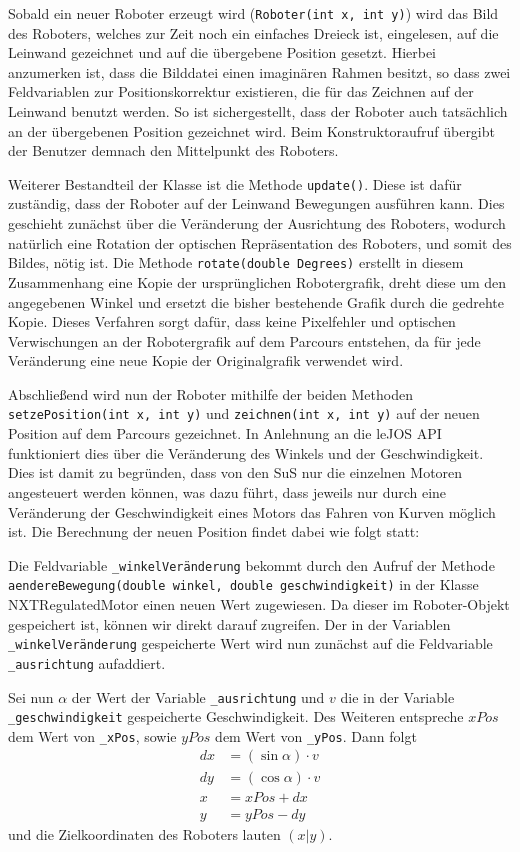 \documentclass[paper=a4, DIV=calc, BCOR=12mm, twoside=on, onecolumn=on, open = right, titlepage =on, parskip =half-, headsepline = on, footsepline = off, chapterprefix = off, appendixprefix = on, fontsize = 12pt, numbers = noenddot, abstract = on]{scrbook}
\begin{document}
Sobald ein neuer Roboter erzeugt wird (\texttt{Roboter(int x, int y)}) wird das Bild des Roboters, welches zur Zeit noch ein einfaches Dreieck ist, eingelesen, auf die Leinwand gezeichnet und auf die übergebene Position gesetzt. Hierbei anzumerken ist, dass die Bilddatei einen imaginären Rahmen besitzt, so dass zwei Feldvariablen zur Positionskorrektur existieren, die für das Zeichnen auf der Leinwand benutzt werden. So ist sichergestellt, dass der Roboter auch tatsächlich an der übergebenen Position gezeichnet wird. Beim Konstruktoraufruf übergibt der Benutzer demnach den Mittelpunkt des Roboters.

Weiterer Bestandteil der Klasse ist die Methode \texttt{update()}. Diese ist dafür zuständig, dass der Roboter auf der Leinwand Bewegungen ausführen kann. Dies geschieht zunächst über die Veränderung der Ausrichtung des Roboters, wodurch natürlich eine Rotation der optischen Repräsentation des Roboters, und somit des Bildes, nötig ist. Die Methode \texttt{rotate(double Degrees)} erstellt in diesem Zusammenhang eine Kopie der ursprünglichen Robotergrafik, dreht diese um den angegebenen Winkel und ersetzt die bisher bestehende Grafik durch die gedrehte Kopie. Dieses Verfahren sorgt dafür, dass keine Pixelfehler und optischen Verwischungen an der Robotergrafik auf dem Parcours entstehen, da für jede Veränderung eine neue Kopie der Originalgrafik verwendet wird.

Abschließend wird nun der Roboter mithilfe der beiden Methoden \texttt{se\-tzePo\-si\-tion(int x, int y)} und \texttt{zeichnen(int x, int y)} auf der neuen Position auf dem Parcours gezeichnet. In Anlehnung an die leJOS API funktioniert dies über die Veränderung des Winkels und der Geschwindigkeit. Dies ist damit zu begründen, dass von den SuS nur die einzelnen Motoren angesteuert werden können, was dazu führt, dass jeweils nur durch eine Veränderung der Geschwindigkeit eines Motors das Fahren von Kurven möglich ist. Die Berechnung der neuen Position findet dabei wie folgt statt:

Die Feldvariable \texttt{{\_}win\-kel\-Ver\-än\-derung} bekommt durch den Aufruf der Methode \texttt{aen\-de\-re\-Be\-we\-gung(double win\-kel, double ge\-schwin\-dig\-keit)} in der Klasse NXTRegulatedMotor einen neuen Wert zugewiesen. Da dieser im Roboter-Objekt gespeichert ist, können wir direkt darauf zugreifen. Der in der Variablen \texttt{{\_}win\-kel\-Ver\-än\-derung} gespeicherte Wert wird nun zunächst auf die Feldvariable \texttt{{\_}ausrichtung} aufaddiert. 

Sei nun $\alpha$ der Wert der Variable \texttt{{\_}ausrichtung} und $v$ die in der Variable \texttt{{\_}ge\-schwin\-dig\-keit} gespeicherte Geschwindigkeit. Des Weiteren entspreche $xPos$ dem Wert von \texttt{{\_}xPos}, sowie $yPos$ dem Wert von \texttt{{\_}yPos}. Dann folgt
\begin{align*}
dx & = \left( \sin \alpha \right) \cdot v\\
dy & = \left( \cos \alpha \right) \cdot v\\
x & = xPos + dx\\
y & = yPos - dy
\end{align*}
und die Zielkoordinaten des Roboters lauten $\left( x \vert y \right)$.
\end{document}
